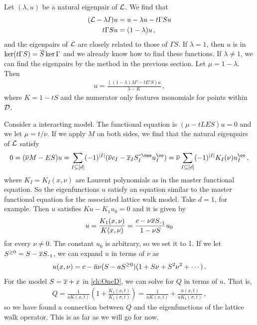 Let $(\lambda, u)$ be a natural eigenpair of $\mathcal{L}$. We find that
\begin{align}
	\begin{split}
		(\mathcal{L}-\lambda I) u &= u - \lambda u -t\Gamma Su\\
		t \Gamma S u &= (1-\lambda)u\,,
	\end{split}
\end{align}
and the eigenpairs of $\mathcal{L}$ are closely related to those of $\Gamma S$. If $\lambda = 1$, then $u$ is in $\ker(t\Gamma S) = \overline{S} \ker \Gamma$ and we already know how to find these functions. If $\lambda \neq 1$, we can find the eigenpairs by the method in the previous section. Let $\mu = 1-\lambda$. Then
\begin{align}
	u = \frac{((1-\lambda) M' - tE'S)u}{\lambda - K}\,,
\end{align}
where $K = 1 - tS$ and the numerator only features monomials for points within $\mathcal{D}$.

\begin{exa} Consider a \classic interacting \twoD model. The functional equation is $(\mu - t LES)u = 0$ and we let $\mu = t/\nu$. If we apply $M$ on both sides, we find that the natural eigenpairs of $\mathcal{L}$ satisfy
\begin{align}
	0 = (\ol \nu M - E S)u = \sum_{I\subseteq [d]} (-1)^{|I|}(\ol \nu c_I -  \ol x_I S_I^{\um \one} u_I^\oo) = \ol \nu \sum_{I\subseteq [d]} (-1)^{|I|} K_I(\nu) u_I^\oo \,,
\end{align}
where $K_I = K_I(x, \nu)$ are Laurent polynomials as in the master functional equation. So the eigenfunctions $u$ satisfy an equation similar to the master functional equation for the associated lattice walk model. Take $d = 1$, for example. Then $u$ satisfies $K u - K_1 u_0= 0$ and it is given by
\begin{align}
	 u = \frac{K_1(x, \nu)}{K(x, \nu)} = \frac{c - \nu \ol x S_{\um 1}}{1 - \nu S} u_0
\end{align}
for every $\nu \neq 0$. The constant $u_0$ is arbitrary, so we set it to 1. If we let $S^{\ge 0} = S - \ol x S_{\um 1}$, we can expand $u$ in terms of $\nu$ as
\begin{align}
	u(x, \nu) = c  - \overline{a}\nu (S - a S^{\ge 0})(1 + S\nu+ S^2 \nu^2 +\cdots)\,.
\end{align}
For the model $S = \overline{x} + x$ in \autoref{ch:OneD}, we can solve for $Q$ in terms of $u$. That is,
\begin{align}
	Q = \frac{1}{aK(x,t)}\left(1 + \frac{K_1(x, t)}{K_1(\sigma, t)}\right) = \frac{1}{aK(x, t)} + \frac{u(x, t)}{a K_1(\sigma, t)}\,,
\end{align}
so we have found a connection between $Q$ and the eigenfunctions of the lattice walk operator. This is as far as we will go for now.
\end{exa}

